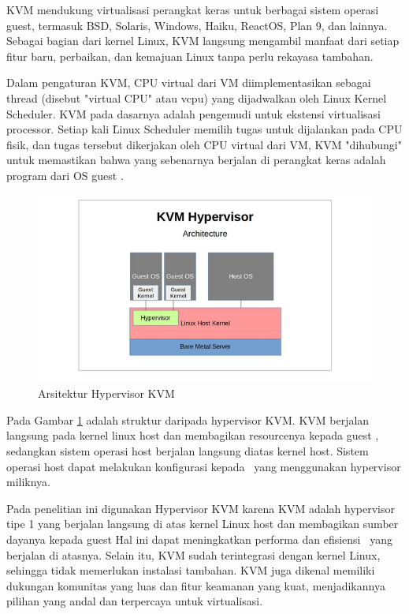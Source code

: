 KVM mendukung virtualisasi perangkat keras untuk berbagai sistem operasi guest, termasuk BSD, Solaris, Windows, Haiku, ReactOS, Plan 9, dan lainnya. Sebagai bagian dari kernel Linux, KVM langsung mengambil manfaat dari setiap fitur baru, perbaikan, dan kemajuan Linux tanpa perlu rekayasa tambahan.

Dalam pengaturan KVM, CPU virtual dari VM diimplementasikan sebagai thread (disebut "virtual CPU" atau vcpu) yang dijadwalkan oleh \f{Linux Kernel Scheduler}. KVM pada dasarnya adalah pengemudi untuk ekstensi virtualisasi processor. Setiap kali \f{Linux Scheduler} memilih tugas untuk dijalankan pada CPU fisik, dan tugas tersebut dikerjakan oleh CPU virtual dari VM, KVM "dihubungi" untuk memastikan bahwa yang sebenarnya berjalan di perangkat keras adalah program dari OS guest \cite{Abeni2020}.

\begin{figure}
	\centering
	\includegraphics[width=1\textwidth]
	{assets/pics/xen-kvm.png}
	\caption{Arsitektur Hypervisor KVM}
	\label{fig:xen-kvm}
\end{figure}

Pada Gambar \ref{fig:xen-kvm} adalah struktur daripada hypervisor KVM. KVM berjalan langsung pada kernel linux host dan membagikan resourcenya kepada guest \vm, sedangkan sistem operasi host berjalan langsung diatas kernel host. Sistem operasi host dapat melakukan konfigurasi kepada \vm\ yang menggunakan hypervisor miliknya.

Pada penelitian ini digunakan Hypervisor KVM karena KVM adalah hypervisor tipe 1 yang berjalan langsung di atas kernel Linux host dan membagikan sumber dayanya kepada guest \vm\. Hal ini dapat meningkatkan performa dan efisiensi \vm\ yang berjalan di atasnya. Selain itu, KVM sudah terintegrasi dengan kernel Linux, sehingga tidak memerlukan instalasi tambahan. KVM juga dikenal memiliki dukungan komunitas yang luas dan fitur keamanan yang kuat, menjadikannya pilihan yang andal dan terpercaya untuk virtualisasi.

